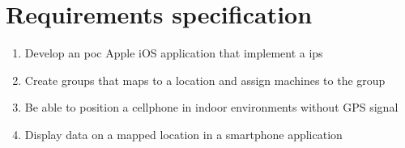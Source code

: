 \chapter{Requirements specification}\label{appendix:requirements}
\begin{enumerate}
	\item Develop an \acrlong{poc} Apple iOS application that implement a \acrlong{ips} \label{req:developeApp}
	\item Create groups that maps to a location and assign machines to the group \label{req:createGroups}
	\item Be able to position a cellphone in indoor environments without GPS signal \label{req:positionDevice}
	\item Display data on a mapped location in a smartphone application \label{req:displayData}
\end{enumerate}

